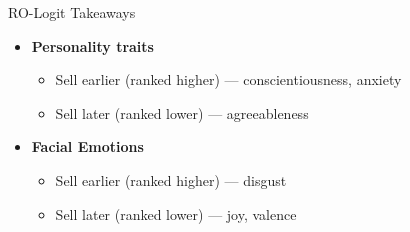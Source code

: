 \documentclass{beamer}
\begin{document}
\begin{frame}{RO-Logit Takeaways}
\begin{itemize}
    \item \textbf{Personality traits} 
    \begin{itemize}
        \item Sell earlier (ranked higher) --- conscientiousness, anxiety
        \item Sell later (ranked lower) --- agreeableness
    \end{itemize}
\vspace{0.2in}
    \item \textbf{Facial Emotions} 
    \begin{itemize}
        \item Sell earlier (ranked higher) --- disgust
        \item Sell later (ranked lower) --- joy, valence 
    \end{itemize}
\end{itemize}
\end{frame}
\end{document}
